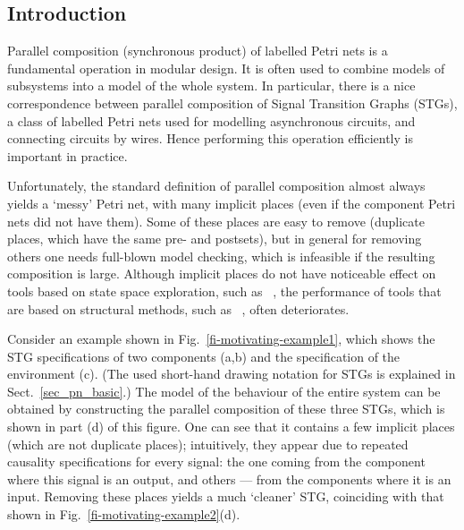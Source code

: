 \subsection{Introduction}

Parallel composition (\aka synchronous product) of labelled
Petri nets is a fundamental operation in modular design. It is
often used to combine models of subsystems into a model of the
whole system. In particular, there is a nice correspondence
between parallel composition of Signal Transition Graphs
(STGs), a class of labelled Petri nets used for modelling
asynchronous circuits, and connecting circuits by wires. Hence
performing this operation efficiently is important in practice.

Unfortunately, the standard definition of parallel composition almost always yields a `messy' Petri net, with many implicit places (even if the component Petri nets did not have them). Some of these places are easy to remove (\eg duplicate places, which have the same pre- and postsets), but in general for removing others one needs full-blown model checking, which is infeasible if the resulting composition is large.
Although implicit places do not have noticeable effect on tools based on state space exploration, such as \petrify~\cite{ckkly97}, the performance of tools that are based on structural methods, such as \desij~\cite{Sch07}, often deteriorates.

Consider an example shown in Fig.~\ref{fi-motivating-example1},
which shows the STG specifications of two components (a,b) and
the specification of the environment (c). (The used short-hand
drawing notation for STGs is explained in
Sect.~\ref{sec_pn_basic}.) The model of the behaviour of the
entire system can be obtained by constructing the parallel
composition of these three STGs, which is shown in part (d) of
this figure. One can see that it contains a few implicit places
(which are not duplicate places); intuitively, they appear due
to repeated causality specifications for every signal: the one
coming from the component where this signal is an output, and
others --- from the components where it is an input. Removing
these places yields a much `cleaner' STG, coinciding with that
shown in Fig.~\ref{fi-motivating-example2}(d).

